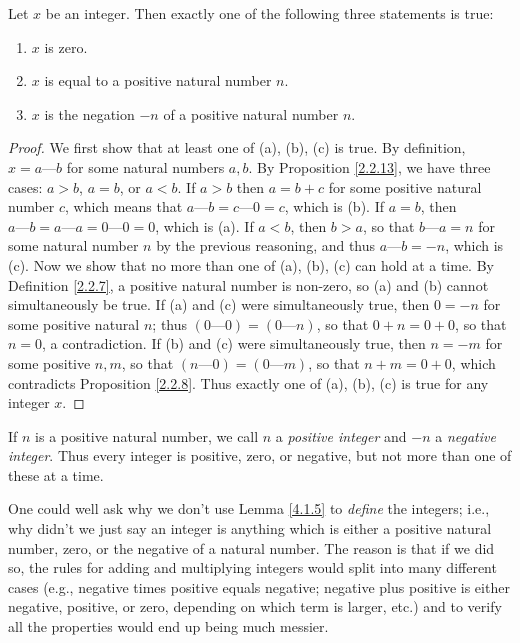 \begin{lemma}\label{4.1.5}
    Let \(x\) be an integer.
    Then exactly one of the following three statements is true:
    \begin{enumerate}
        \item \(x\) is zero.
        \item \(x\) is equal to a positive natural number \(n\).
        \item \(x\) is the negation \(-n\) of a positive natural number \(n\).
    \end{enumerate}
\end{lemma}

\begin{proof}
    We first show that at least one of (a), (b), (c) is true.
    By definition, \(x = a \text{---} b\) for some natural numbers \(a, b\).
    By Proposition \ref{2.2.13}, we have three cases: \(a > b\), \(a = b\), or \(a < b\).
    If \(a > b\) then \(a = b + c\) for some positive natural number \(c\), which means that \(a \text{---} b = c \text{---} 0 = c\), which is (b).
    If \(a = b\), then \(a \text{---} b = a \text{---} a = 0 \text{---} 0 = 0\), which is (a).
    If \(a < b\), then \(b > a\), so that \(b \text{---} a = n\) for some natural number \(n\) by the previous reasoning, and thus \(a \text{---} b = -n\), which is (c).
    Now we show that no more than one of (a), (b), (c) can hold at a time.
    By Definition \ref{2.2.7}, a positive natural number is non-zero, so (a) and (b) cannot simultaneously be true.
    If (a) and (c) were simultaneously true, then \(0 = -n\) for some positive natural \(n\);
    thus \((0 \text{---} 0) = (0 \text{---} n)\), so that \(0 + n = 0 + 0\), so that \(n = 0\), a contradiction.
    If (b) and (c) were simultaneously true, then \(n = -m\) for some positive \(n, m\), so that \((n \text{---} 0) = (0 \text{---} m)\), so that \(n + m = 0 + 0\), which contradicts Proposition \ref{2.2.8}.
    Thus exactly one of (a), (b), (c) is true for any integer \(x\).
\end{proof}

\begin{note}
    If \(n\) is a positive natural number, we call \(n\) a \emph{positive integer} and \(-n\) a \emph{negative integer}.
    Thus every integer is positive, zero, or negative, but not more than one of these at a time.
\end{note}

\begin{note}
    One could well ask why we don't use Lemma \ref{4.1.5} to \emph{define} the integers;
    i.e., why didn't we just say an integer is anything which is either a positive natural number, zero, or the negative of a natural number.
    The reason is that if we did so, the rules for adding and multiplying integers would split into many different cases (e.g., negative times positive equals negative; negative plus positive is either negative, positive, or zero, depending on which term is larger, etc.) and to verify all the properties would end up being much messier.
\end{note}

